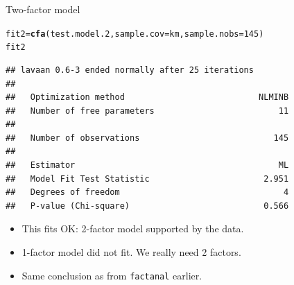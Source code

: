 \documentclass[unknownkeysallowed]{beamer}\usepackage[]{graphicx}\usepackage[]{color}
\makeatletter
\newcommand{\hlnum}[1]{\textcolor[rgb]{0.686,0.059,0.569}{#1}}%
\newcommand{\hlstd}[1]{\textcolor[rgb]{0.345,0.345,0.345}{#1}}%
\newcommand{\hlkwb}[1]{\textcolor[rgb]{0.69,0.353,0.396}{#1}}%
\newcommand{\hlkwc}[1]{\textcolor[rgb]{0.333,0.667,0.333}{#1}}%
\newcommand{\hlkwd}[1]{\textcolor[rgb]{0.737,0.353,0.396}{\textbf{#1}}}%
\newenvironment{kframe}{%
 \def\at@end@of@kframe{}%
 \ifinner\ifhmode%
  \def\at@end@of@kframe{\end{minipage}}%
  \begin{minipage}{\columnwidth}%
 \fi\fi%
 \def\FrameCommand##1{\hskip\@totalleftmargin \hskip-\fboxsep
 \colorbox{shadecolor}{##1}\hskip-\fboxsep
     \hskip-\linewidth \hskip-\@totalleftmargin \hskip\columnwidth}%
 \MakeFramed {\advance\hsize-\width
   \@totalleftmargin\z@ \linewidth\hsize
   \@setminipage}}%
 {\par\unskip\endMakeFramed%
 \at@end@of@kframe}
\newenvironment{knitrout}{}{} %
\makeatother
\begin{document}
\begin{frame}[fragile]{Two-factor model}


\begin{knitrout}\scriptsize
{}\color{fgcolor}\begin{kframe}
\begin{alltt}
\hlstd{fit2}\hlkwb{=}\hlkwd{cfa}\hlstd{(test.model.2,}\hlkwc{sample.cov}\hlstd{=km,}\hlkwc{sample.nobs}\hlstd{=}\hlnum{145}\hlstd{)}
\hlstd{fit2}
\end{alltt}
\begin{verbatim}
## lavaan 0.6-3 ended normally after 25 iterations
## 
##   Optimization method                           NLMINB
##   Number of free parameters                         11
## 
##   Number of observations                           145
## 
##   Estimator                                         ML
##   Model Fit Test Statistic                       2.951
##   Degrees of freedom                                 4
##   P-value (Chi-square)                           0.566
\end{verbatim}
\end{kframe}
\end{knitrout}

\begin{itemize}
\item This fits OK: 2-factor model supported by the data.
\item 1-factor model did not fit. We really need 2 factors.
\item Same conclusion as from \texttt{factanal} earlier.
\end{itemize}
  
\end{frame}
\end{document}
